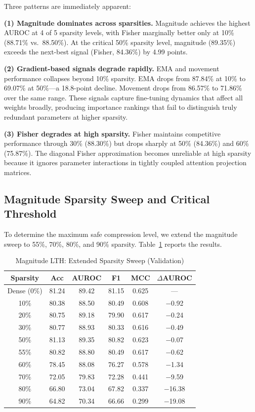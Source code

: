 \documentclass[journal]{IEEEtran}
\begin{document}
Three patterns are immediately apparent:

\textbf{(1) Magnitude dominates across sparsities.}
Magnitude achieves the highest AUROC at 4 of 5 sparsity levels,
with Fisher marginally better only at 10\% (88.71\% vs.\ 88.50\%).
At the critical 50\% sparsity level, magnitude (89.35\%) exceeds
the next-best signal (Fisher, 84.36\%) by 4.99 points.

\textbf{(2) Gradient-based signals degrade rapidly.}
EMA and movement performance collapses beyond 10\% sparsity.
EMA drops from 87.84\% at 10\% to 69.07\% at 50\%---a 18.8-point
decline.
Movement drops from 86.57\% to 71.86\% over the same range.
These signals capture fine-tuning dynamics that affect all weights
broadly, producing importance rankings that fail to distinguish
truly redundant parameters at higher sparsity.

\textbf{(3) Fisher degrades at high sparsity.}
Fisher maintains competitive performance through 30\% (88.30\%)
but drops sharply at 50\% (84.36\%) and 60\% (75.87\%).
The diagonal Fisher approximation becomes unreliable at high
sparsity because it ignores parameter interactions in tightly
coupled attention projection matrices.

\subsection{Magnitude Sparsity Sweep and Critical Threshold}

To determine the maximum safe compression level, we extend
the magnitude sweep to 55\%, 70\%, 80\%, and 90\% sparsity.
Table~\ref{tab:jackpot} reports the results.

\begin{table}[!t]
\centering
\caption{Magnitude LTH: Extended Sparsity Sweep (Validation)}
\label{tab:jackpot}
\renewcommand{\arraystretch}{1.2}
\begin{tabular}{@{}cccccc@{}}
\toprule
\textbf{Sparsity} & \textbf{Acc} & \textbf{AUROC} &
\textbf{F1} & \textbf{MCC} & \textbf{$\Delta$AUROC} \\
\midrule
Dense (0\%) & 81.24 & 89.42 & 81.15 & 0.625 & --- \\
\midrule
10\% & 80.38 & 88.50 & 80.49 & 0.608 & $-$0.92 \\
20\% & 80.75 & 89.18 & 79.90 & 0.617 & $-$0.24 \\
30\% & 80.77 & 88.93 & 80.33 & 0.616 & $-$0.49 \\
50\% & 81.13 & 89.35 & 80.82 & 0.623 & $-$0.07 \\
55\% & 80.82 & 88.80 & 80.49 & 0.617 & $-$0.62 \\
60\% & 78.45 & 88.08 & 76.27 & 0.578 & $-$1.34 \\
\midrule
70\% & 72.05 & 79.83 & 72.28 & 0.441 & $-$9.59 \\
80\% & 66.80 & 73.04 & 67.82 & 0.337 & $-$16.38 \\
90\% & 64.82 & 70.34 & 66.66 & 0.299 & $-$19.08 \\
\bottomrule
\end{tabular}
\end{table}
\end{document}
